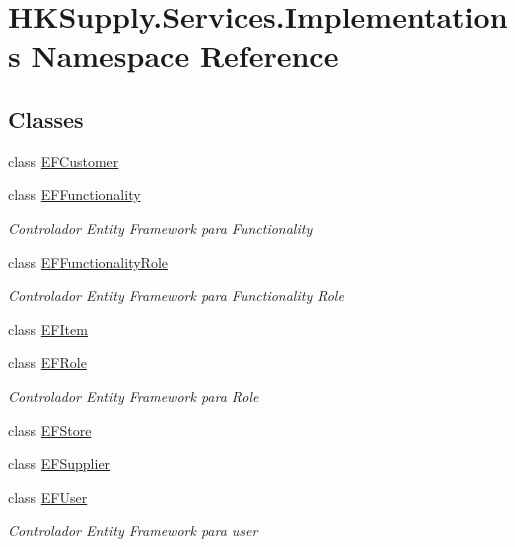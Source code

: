 \hypertarget{namespace_h_k_supply_1_1_services_1_1_implementations}{}\section{H\+K\+Supply.\+Services.\+Implementations Namespace Reference}
\label{namespace_h_k_supply_1_1_services_1_1_implementations}
\subsection*{Classes}
\begin{DoxyCompactItemize}
\item 
class \hyperlink{class_h_k_supply_1_1_services_1_1_implementations_1_1_e_f_customer}{E\+F\+Customer}
\item 
class \hyperlink{class_h_k_supply_1_1_services_1_1_implementations_1_1_e_f_functionality}{E\+F\+Functionality}
\begin{DoxyCompactList}\small\item\em Controlador Entity Framework para Functionality \end{DoxyCompactList}\item 
class \hyperlink{class_h_k_supply_1_1_services_1_1_implementations_1_1_e_f_functionality_role}{E\+F\+Functionality\+Role}
\begin{DoxyCompactList}\small\item\em Controlador Entity Framework para Functionality Role \end{DoxyCompactList}\item 
class \hyperlink{class_h_k_supply_1_1_services_1_1_implementations_1_1_e_f_item}{E\+F\+Item}
\item 
class \hyperlink{class_h_k_supply_1_1_services_1_1_implementations_1_1_e_f_role}{E\+F\+Role}
\begin{DoxyCompactList}\small\item\em Controlador Entity Framework para Role \end{DoxyCompactList}\item 
class \hyperlink{class_h_k_supply_1_1_services_1_1_implementations_1_1_e_f_store}{E\+F\+Store}
\item 
class \hyperlink{class_h_k_supply_1_1_services_1_1_implementations_1_1_e_f_supplier}{E\+F\+Supplier}
\item 
class \hyperlink{class_h_k_supply_1_1_services_1_1_implementations_1_1_e_f_user}{E\+F\+User}
\begin{DoxyCompactList}\small\item\em Controlador Entity Framework para user \end{DoxyCompactList}\end{DoxyCompactItemize}
